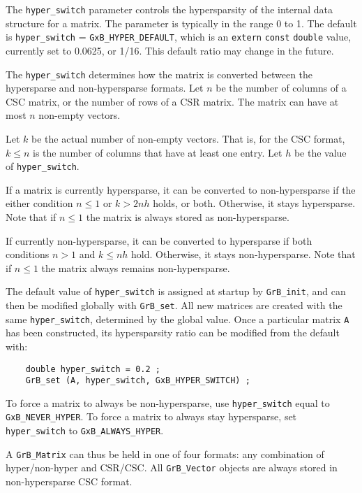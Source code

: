 The \verb'hyper_switch' parameter controls the hypersparsity of the internal
data structure for a matrix.  The parameter is typically in the range 0 to 1.
The default is \verb'hyper_switch' = \verb'GxB_HYPER_DEFAULT', which is an
\verb'extern' \verb'const' \verb'double' value, currently set to 0.0625, or
1/16.  This default ratio may change in the future.

The \verb'hyper_switch' determines how the matrix is converted between the
hypersparse and non-hypersparse formats.  Let $n$ be the number of columns of a
CSC matrix, or the number of rows of a CSR matrix.  The matrix can have at most
$n$ non-empty vectors.

Let $k$ be the actual number of non-empty vectors.  That is, for the CSC
format, $k \le n$ is the number of columns that have at least one entry.  Let
$h$ be the value of \verb'hyper_switch'.

If a matrix is currently hypersparse, it can be converted to non-hypersparse if
the either condition $n \le 1$ or $k > 2nh$ holds, or both.  Otherwise, it
stays hypersparse.  Note that if $n \le 1$ the matrix is always stored as
non-hypersparse.

If currently non-hypersparse, it can be converted to hypersparse if
both conditions $n > 1$ and $k \le nh$ hold.  Otherwise, it stays
non-hypersparse.  Note that if $n \le 1$ the matrix always remains
non-hypersparse.

The default value of \verb'hyper_switch' is assigned at startup by
\verb'GrB_init', and can then be modified globally with \verb'GrB_set'.  All
new matrices are created with the same \verb'hyper_switch', determined by the
global value.  Once a particular matrix \verb'A' has been constructed, its
hypersparsity ratio can be modified from the default with:

    {\footnotesize
    \begin{verbatim}
    double hyper_switch = 0.2 ;
    GrB_set (A, hyper_switch, GxB_HYPER_SWITCH) ; \end{verbatim}}

To force a matrix to always be non-hypersparse, use \verb'hyper_switch' equal to
\verb'GxB_NEVER_HYPER'.  To force a matrix to always stay hypersparse, set
\verb'hyper_switch' to \verb'GxB_ALWAYS_HYPER'.

A \verb'GrB_Matrix' can thus be held in one of four formats: any combination of
hyper/non-hyper and CSR/CSC.  All \verb'GrB_Vector' objects are always stored
in non-hypersparse CSC format.

